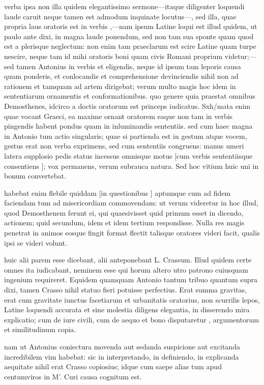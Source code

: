  verba ipsa non illa quidem elegantissimo sermone—itaque diligenter loquendi laude caruit neque tamen est admodum inquinate locutus—, sed illa, quae propria laus oratoris est in verbis ,—nam ipsum Latine loqui est illud quidem, ut paulo ante dixi, in magna laude ponendum, sed non tam sua sponte quam quod est a plerisque neglectum: non enim tam praeclarum est scire Latine quam turpe nescire, neque tam id mihi oratoris boni quam civis Romani proprium videtur;—sed tamen Antonius in verbis et eligendis, neque id ipsum tam leporis causa quam ponderis, et conlocandis et comprehensione devinciendis nihil non ad rationem et tamquam ad artem dirigebat; verum multo magis hoc idem in sententiarum ornamentis et conformationibus. quo genere quia praestat omnibus Demosthenes, idcirco a doctis oratorum est princeps iudicatus. Sxh/mata enim quae vocant Graeci, ea maxime ornant oratorem eaque non tam in verbis pingendis habent pondus quam in inluminandis sententiis. sed cum haec magna in Antonio tum actio singularis; quae si partienda est in gestum atque vocem, gestus erat non verba exprimens, sed cum sententiis congruens: manus umeri latera supplosio pedis status incessus omnisque motus [cum verbis sententiisque consentiens ]; vox permanens, verum subrauca natura. Sed hoc vitium huic uni in bonum convertebat.

 habebat enim flebile quiddam [in questionibus ] aptumque cum ad fidem faciendam tum ad misericordiam commovendam: ut verum videretur in hoc illud, quod Demosthenem ferunt ei, qui quaesivisset quid primum esset in dicendo, actionem; quid secundum, idem et idem tertium respondisse. Nulla res magis penetrat in animos eosque fingit format flectit talisque oratores videri facit, qualis ipsi se videri volunt.

 huic alii parem esse dicebant, alii anteponebant L. Crassum. Illud quidem certe omnes ita iudicabant, neminem esse qui horum altero utro patrono cuiusquam ingenium requireret. Equidem quamquam Antonio tantum tribuo quantum supra dixi, tamen Crasso nihil statuo fieri potuisse perfectius. Erat summa gravitas, erat cum gravitate iunctus facetiarum et urbanitatis oratorius, non scurrilis lepos, Latine loquendi accurata et sine molestia diligens elegantia, in disserendo mira explicatio; cum de iure civili, cum de aequo et bono disputaretur , argumentorum et similitudinum copia.

 nam ut Antonius coniectura movenda aut sedanda suspicione aut excitanda incredibilem vim habebat: sic in interpretando, in definiendo, in explicanda aequitate nihil erat Crasso copiosius; idque cum saepe alias tum apud centumviros in M'. Curi causa cognitum est.


